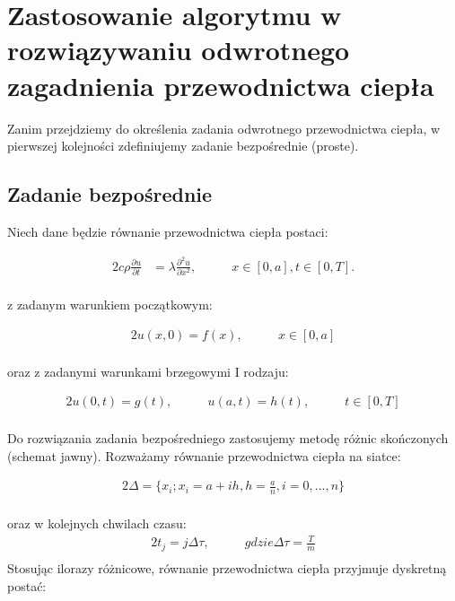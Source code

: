 \documentclass[twoside]{projektInzynierskiMS1}
\newcommand{\si}{ś}
\begin{document}
\section[Odwrotne zagadnienie przewodnictwa ciepła]{Zastosowanie algorytmu w rozwiązywaniu odwrotnego zagadnienia przewodnictwa ciepła}

Zanim przejdziemy do określenia zadania odwrotnego przewodnictwa ciepła, w pierwszej kolejności zdefiniujemy zadanie bezpośrednie (proste).

\subsection{Zadanie bezpo\si rednie}
Niech dane będzie równanie przewodnictwa ciepła postaci:

\begin{alignat*}{2}
c\rho \frac{\partial u}{\partial t}&= \lambda \frac{\partial^2 u}{\partial x^2},&\qquad  x \in [0, a], t \in [0, T].\\
\end{alignat*}


z zadanym warunkiem początkowym:

\begin{alignat*}{2}
u(x, 0) = f(x),&\qquad  x \in [0, a]\\
\end{alignat*}


oraz z zadanymi warunkami brzegowymi I rodzaju:

\begin{alignat*}{2}
u(0,t) = g(t),&\qquad  u(a, t) = h(t), &\qquad t \in [0, T]\\
\end{alignat*}


Do rozwiązania zadania bezpośredniego zastosujemy metodę różnic skończonych (schemat jawny).
Rozważamy równanie przewodnictwa ciepła na siatce:

\begin{alignat*}{2}
\Delta = \{ x_i; x_i = a + ih, h = \frac{a}{n},  i=0, ..., n\}\\
\end{alignat*}

oraz w kolejnych chwilach czasu:
\begin{alignat*}{2}
t_j = j \Delta \tau, &\qquad gdzie \Delta \tau = \frac{T}{m}\\
\end{alignat*}
Stosując ilorazy różnicowe, równanie przewodnictwa ciepła przyjmuje dyskretną postać:
\end{document}
